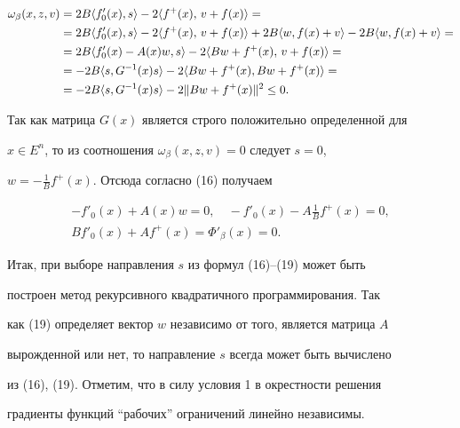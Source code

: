\begin{align*} 


\omega_\beta(x,z,v)&=2B\la f'_0(x),s\ra-2\la f^+(x),\, 


v+f(x)\ra =\\ 


&=2B\la f'_0(x),s\ra-2\la f^+(x),\,v+f(x)\ra+ 


2B\la w,f(x)+v\ra- 2B\la w,f(x)+v\ra = \\ 


&=2B\la f'_0(x)-A(x)w,s\ra -2\la B w+f^+(x),\,v+f(x)\ra =\\ 


&=-2B\la s,G^{-1}(x)s\ra-2\la B w+f^+(x),B w+f^+(x)\ra= \\ 


&=-2B\la s,G^{-1}(x)s\ra-2\|B w+f^+(x)\|^2\le 0. 


\end{align*} 


 


Так как матрица $G(x)$ является строго положительно определенной для


$x\in E^n$, то из соотношения $\omega_\beta(x,z,v)=0$ следует $s=0$, 


$w=-\frac{1}{B}f^+(x)$. Отсюда согласно (16) получаем 


\begin{gather*} 


-f'_0(x)+A(x)w=0,\quad -f'_0(x)-A\frac{1}{B}f^+(x)=0,\\ 


B f'_0(x)+A f^+(x)=\Phi'_\beta(x)=0. 


\end{gather*} 


 


Итак, при выборе направления $s$ из формул (16)--(19) может быть 


построен метод рекурсивного квадратичного программирования. Так 


как (19) определяет вектор $w$ независимо от того, является матрица $A$ 


вырожденной или нет, то направление $s$ всегда может быть вычислено 


из (16), (19). Отметим, что в силу условия 1 в окрестности решения 


градиенты функций ``рабочих'' ограничений линейно независимы. 


 



